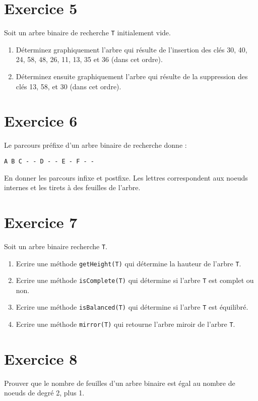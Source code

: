 \documentclass[a4paper,10pt]{article}
\begin{document}
\section*{Exercice 5}

Soit un arbre binaire de recherche \texttt{T} initialement vide.

\begin{enumerate}

\item Déterminez graphiquement l'arbre qui résulte de l'insertion des clés 30, 40, 24, 58, 48, 26, 11, 13, 35 et 36 (dans cet ordre).

\item Déterminez ensuite graphiquement l'arbre qui résulte de la suppression des clés 13, 58, et 30 (dans cet ordre).

\end{enumerate}

\section*{Exercice 6}

Le parcours préfixe d'un arbre binaire de recherche donne :
\begin{verbatim}
A B C - - D - - E - F - -
\end{verbatim}

En donner les parcours infixe et postfixe. Les lettres correspondent aux
noeuds internes et les tirets à des feuilles de l'arbre.

\section*{Exercice 7}

Soit un arbre binaire recherche \texttt{T}.

\begin{enumerate}

\item Ecrire une méthode \texttt{getHeight(T)} qui détermine la hauteur de l'arbre \texttt{T}.

\item Ecrire une méthode \texttt{isComplete(T)} qui détermine si l'arbre \texttt{T} est complet ou non.

\item Ecrire une méthode \texttt{isBalanced(T)} qui détermine si l'arbre \texttt{T} est équilibré.

\item Ecrire une méthode \texttt{mirror(T)} qui retourne l'arbre miroir de l'arbre \texttt{T}.

\end{enumerate}

\section*{Exercice 8}

Prouver que le nombre de feuilles d'un arbre binaire est égal au nombre de noeuds de degré 2, plus 1.
\end{document}
